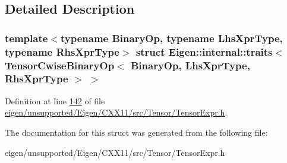 \subsection{Detailed Description}
\subsubsection*{template$<$typename Binary\+Op, typename Lhs\+Xpr\+Type, typename Rhs\+Xpr\+Type$>$\newline
struct Eigen\+::internal\+::traits$<$ Tensor\+Cwise\+Binary\+Op$<$ Binary\+Op, Lhs\+Xpr\+Type, Rhs\+Xpr\+Type $>$ $>$}



Definition at line \hyperlink{eigen_2unsupported_2_eigen_2_c_x_x11_2src_2_tensor_2_tensor_expr_8h_source_l00142}{142} of file \hyperlink{eigen_2unsupported_2_eigen_2_c_x_x11_2src_2_tensor_2_tensor_expr_8h_source}{eigen/unsupported/\+Eigen/\+C\+X\+X11/src/\+Tensor/\+Tensor\+Expr.\+h}.



The documentation for this struct was generated from the following file\+:\begin{DoxyCompactItemize}
\item 
eigen/unsupported/\+Eigen/\+C\+X\+X11/src/\+Tensor/\+Tensor\+Expr.\+h\end{DoxyCompactItemize}
